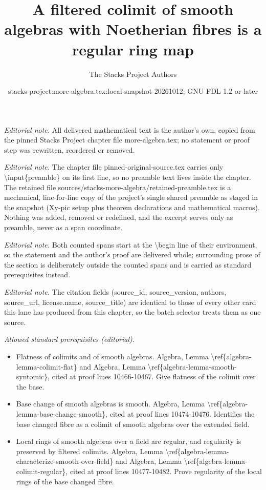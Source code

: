 \documentclass[10pt,a4paper]{amsart}
\title{A filtered colimit of smooth algebras with Noetherian fibres is a regular ring map}
\author{The Stacks Project Authors}
\date{stacks-project:more-algebra.tex:local-snapshot-20261012; GNU FDL 1.2 or later}
\theoremstyle{plain}
\theoremstyle{definition}
\theoremstyle{remark}
\numberwithin{equation}{subsection}
\begin{document}
\maketitle
\setcounter{subsection}{1}
\noindent\textit{Editorial note.} All delivered mathematical text is the author's own, copied from the pinned Stacks Project chapter file more-algebra.tex; no statement or proof step was rewritten, reordered or removed.\par\medskip
\noindent\textit{Editorial note.} The chapter file pinned-original-source.tex carries only \textbackslash{}input\{preamble\} on its first line, so no preamble text lives inside the chapter. The retained file sources/stacks-more-algebra/retained-preamble.tex is a mechanical, line-for-line copy of the project's single shared preamble as staged in the snapshot (Xy-pic setup plus theorem declarations and mathematical macros). Nothing was added, removed or redefined, and the excerpt serves only as preamble, never as a span coordinate.\par\medskip
\noindent\textit{Editorial note.} Both counted spans start at the \textbackslash{}begin line of their environment, so the statement and the author's proof are delivered whole; surrounding prose of the section is deliberately outside the counted spans and is carried as standard prerequisites instead.\par\medskip
\noindent\textit{Editorial note.} The citation fields (source\_id, source\_version, authors, source\_url, license.name, source\_title) are identical to those of every other card this lane has produced from this chapter, so the batch selector treats them as one source.\par\medskip
\noindent\textit{Allowed standard prerequisites (editorial).}\begin{itemize}
\item Flatness of colimits and of smooth algebras. Algebra, Lemma \textbackslash{}ref\{algebra-lemma-colimit-flat\} and Algebra, Lemma \textbackslash{}ref\{algebra-lemma-smooth-syntomic\}, cited at proof lines 10466-10467. Give flatness of the colimit over the base.
\item Base change of smooth algebras is smooth. Algebra, Lemma \textbackslash{}ref\{algebra-lemma-base-change-smooth\}, cited at proof lines 10474-10476. Identifies the base changed fibre as a colimit of smooth algebras over the extended field.
\item Local rings of smooth algebras over a field are regular, and regularity is preserved by filtered colimits. Algebra, Lemma \textbackslash{}ref\{algebra-lemma-characterize-smooth-over-field\} and Algebra, Lemma \textbackslash{}ref\{algebra-lemma-colimit-regular\}, cited at proof lines 10477-10482. Prove regularity of the local rings of the base changed fibre.
\end{itemize}\medskip
\end{document}
